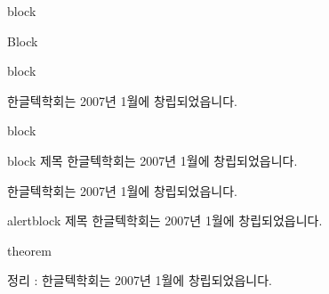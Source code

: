 \documentclass[10pt,blue,xcolor=pdftex,dvipsnames,table,handout]{beamer}
\begin{document}

		\begin{frame}[t]{block}

			\begin{block} {Block}
			\end{block}

		\end{frame}


		\begin{frame}[t]{block}

			\begin{block} {}
			한글텍학회는 2007년 1월에 창립되었읍니다.	
			\end{block}

		\end{frame}




		\begin{frame}[t]{block}

			\begin{block} {block 제목}
			한글텍학회는 2007년 1월에 창립되었읍니다.	
			\end{block}

			\begin{example}
			한글텍학회는 2007년 1월에 창립되었읍니다.	
			\end{example}

			\begin{alertblock} {alertblock 제목}
			한글텍학회는 2007년 1월에 창립되었읍니다.	
			\end{alertblock}

		\end{frame}

		\begin{frame}[t]{theorem}
			\begin{theorem}
			정리 : 한글텍학회는 2007년 1월에 창립되었읍니다.	
			\end{theorem}
		\end{frame}
\end{document}
